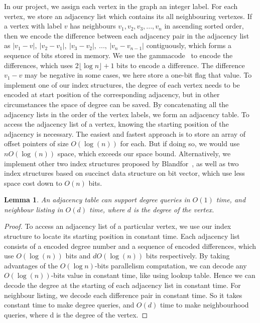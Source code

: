 \documentclass[12pt,glossary]{dalthesis}
\newtheorem{lemma}[theorem]{Lemma}
\begin{document}
\bigskip
\bigskip

In our project, we assign each vertex in the graph an integer label. For each vertex, we store an adjacency list which contains its all neighbouring vertexes. If a vertex with label $v$ has neighbours $v_{1}, v_{2}, v_{3}, ...,v_{n}$ in ascending sorted order, then we encode the difference between each adjacency pair in the adjacency list as $|v_{1}-v|, \ |v_{2}-v_{1}|,\  |v_{3}-v_{2}|,\ ...,\ |v_{n}-v_{n-1}|$ contiguously, which forms a sequence of bits stored in memory. We use the gammacode~\cite{Gamma} to encode the differences, which uses $2\lfloor \log n \rfloor + 1$ bits to encode a difference. The difference $v_{1} - v$ may be negative in some cases, we here store a one-bit flag that value. To implement one of our index structures, the degree of each vertex needs to be encoded at start position of the corresponding adjacency, but in other circumstances the space of degree can be saved. By concatenating all the adjacency lists in the order of the vertex labels, we form an adjacency table. To access the adjacency list of a vertex, knowing the starting position of the adjacency
is necessary. The easiest and fastest approach is to store an array of offset pointers of size $O(\log (n))$ for each. But if doing so, we would use $nO(\log (n))$ space, which exceeds our space bound. Alternatively, we implement other two index structures proposed by Blandfor~\cite{compact-representation}, as well as two index structures based on succinct data structure on bit vector, which use less space cost down to $O(n)$ bits.
\bigskip
\begin{lemma}
An adjacency table can support degree queries in $O(1)$ time, and neighbour
listing in $O(d)$ time, where $d$ is the degree of the vertex.
\end{lemma}
\bigskip 
\begin{proof}
To access an adjacency list of a particular vertex, we use our index structure to locate its starting position in constant time. Each adjacency list consists of a encoded degree number and a sequence of encoded differences, which use $O(\log (n))$ bits and $dO(\log (n))$ bits respectively. By taking advantages of the $O(\log n)$-bits parallelism computation, we can decode any $O(\log (n))$-bits value in constant time, like using lookup table. Hence we can decode the degree at the starting of each adjacency list in constant time. For neighbour listing, we decode each difference pair in constant time. So it takes constant time to make degree queries, and $O(d)$ time to make neighbourhood queries, where d is the degree of the vertex.
\end{proof}
\end{document}
